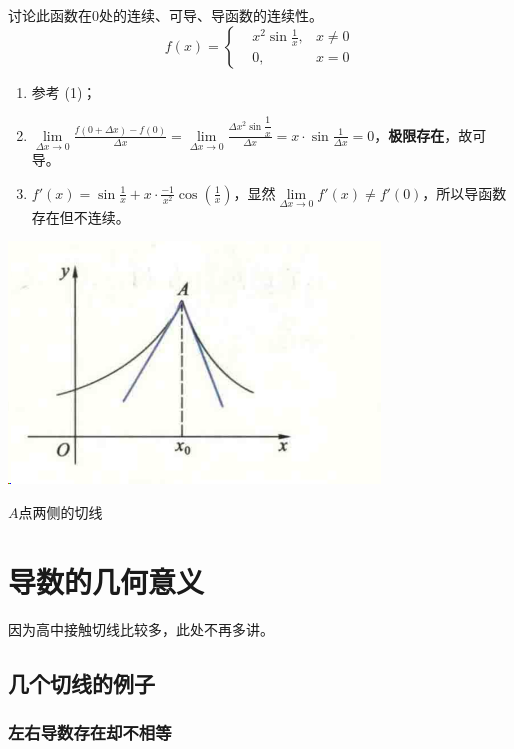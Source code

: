 \begin{example}
	讨论此函数在0处的连续、可导、导函数的连续性。
	$$ f(x)=\left\{
	\begin{aligned}
		&x^2 \sin\frac{1}{x},&x\neq 0\\
		&0,&x=0
	\end{aligned}
	\right.
	$$
	\begin{enumerate}[label=(\arabic*)]
		\item 参考\textcolor{lbexacolor}{} (1)；
		\item $\underset{\Delta x\rightarrow 0}{\lim}\frac{f(0+\Delta x)-f(0)}{\Delta x}=\underset{\Delta x\rightarrow 0}{\lim}\frac{\Delta x^2\sin\dfrac{1}{x}}{\Delta x}=x\cdot\sin\frac{1}{\Delta x}=0$，\textbf{极限存在}，故可导。
		\item $f'(x)=\sin\frac{1}{x}+x\cdot\frac{-1}{x^2}\cos(\frac{1}{x})$，显然$\underset{\Delta x\rightarrow 0}{\lim}f'(x)\neq f'(0)$，所以导函数存在但不连续。
	\end{enumerate}
\end{example}

\begin{marginfigure}[7em]
	\includegraphics[width=\marginparwidth]{figures/screenshot001.png}
	\caption{$A$点两侧的切线}
	\label{fig:1.1}
\end{marginfigure}

\section{导数的几何意义}\label{sec:1.2}
因为高中接触切线比较多，此处不再多讲。

\subsection{几个切线的例子}\label{sec:1.2.1}

\subsubsection{左右导数存在却不相等}\label{sec:1.2.1.1}

